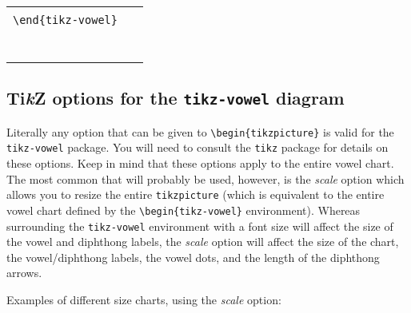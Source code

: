 \documentclass{article}
\newcommand{\pkg}[1]{\texttt{#1}}
\newcommand{\TikZ}{Ti\textit{k}Z\xspace}
\begin{document}
\begin{center}
\begin{tabular}{ll}
  \begin{minipage}[t]{6.5cm}{\small
    \verb|\begin{tikz-vowel}[triangle,three]|\\
    \verb|\end{tikz-vowel}|\\}
  \end{minipage} & 
  \begin{minipage}[t]{6.5cm}
  {~}
  \end{minipage} \\
  \begin{minipage}[t]{6.5cm}{
  \begin{tikz-vowel}\end{tikz-vowel} \\}\end{minipage} &
\end{tabular}
\end{center}

\subsection{\TikZ options for the \pkg{tikz-vowel} diagram}
\label{sec:TikZ options for the tikz-vowel diagram}

Literally any option that can be given to \verb|\begin{tikzpicture}| is valid for the \pkg{tikz-vowel} package.  You will need to consult the \pkg{tikz} package for details on these options.  Keep in mind that these options apply to the entire vowel chart.  The most common that will probably be used, however, is the \textit{scale} option which allows you to resize the entire \texttt{tikzpicture} (which is equivalent to the entire vowel chart defined by the \verb+\begin{tikz-vowel}+ environment).  Whereas surrounding the \texttt{tikz-vowel} environment with a font size will affect the size of the vowel and diphthong labels, the \textit{scale} option will affect the size of the chart, the vowel/diphthong labels, the vowel dots, and the length of the diphthong arrows.

\bigskip
\noindent
Examples of different size charts, using the \textit{scale} option:
\end{document}
